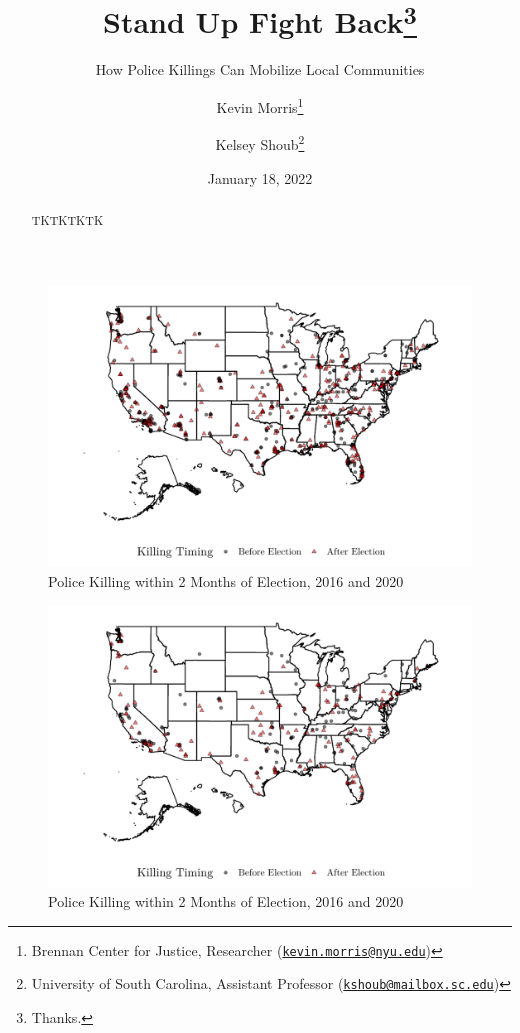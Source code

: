 \documentclass[
  12pt,
]{article}
\title{Stand Up Fight Back\thanks{Thanks.}}
\subtitle{How Police Killings Can Mobilize Local Communities}
\author{Kevin Morris\footnote{Brennan Center for Justice, Researcher (\href{mailto:kevin.morris@nyu.edu}{\nolinkurl{kevin.morris@nyu.edu}})} \and Kelsey Shoub\footnote{University of South Carolina, Assistant Professor (\href{mailto:kshoub@mailbox.sc.edu}{\nolinkurl{kshoub@mailbox.sc.edu}})}}
\date{January 18, 2022}
\begin{document}
\maketitle
\begin{abstract}
TKTKTKTK
\end{abstract}

\pagebreak
\doublespacing


\begin{figure}[h]

{\centering \includegraphics{shoot_to_files/figure-latex/map-1} 

}

\caption{\label{fig:map}Police Killing within 2 Months of Election, 2016 and 2020}\label{fig:map}
\end{figure}

\begin{figure}[h]

{\centering \includegraphics{shoot_to_files/figure-latex/map-16-1} 

}

\caption{\label{fig:map}Police Killing within 2 Months of Election, 2016 and 2020}\label{fig:map-16}
\end{figure}
\end{document}
